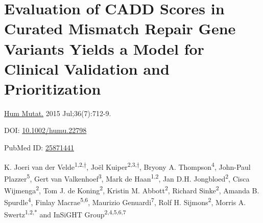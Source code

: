 \linespread{1.00} %
\chapter[Evaluation of CADD Scores in Mismatch Repair Genes]{Evaluation of CADD Scores in Curated Mismatch Repair Gene Variants Yields a Model for Clinical Validation and Prioritization}
\label{chap:caddmmr}
\linespread{1.05} %

{ \Large {} }

\hfill \underline{Hum Mutat.} 2015 Jul;36(7):712-9.

\hfill DOI: \href{https://doi.org/10.1002/humu.22798}{10.1002/humu.22798}

\hfill PubMed ID: \href{https://www.ncbi.nlm.nih.gov/pubmed/25871441}{25871441}


\newpage

\noindent
K. Joeri van der Velde\textsuperscript{1,2,†}, Joël Kuiper\textsuperscript{2,3,†}, Bryony A. Thompson\textsuperscript{4}, John-Paul Plazzer\textsuperscript{5}, Gert van Valkenhoef\textsuperscript{3}, Mark de Haan\textsuperscript{1,2}, Jan D.H. Jongbloed\textsuperscript{2}, Cisca Wijmenga\textsuperscript{2}, Tom J. de Koning\textsuperscript{2}, Kristin M. Abbott\textsuperscript{2}, Richard Sinke\textsuperscript{2}, Amanda B. Spurdle\textsuperscript{4}, Finlay Macrae\textsuperscript{5,6}, Maurizio Genuardi\textsuperscript{7}, Rolf H. Sijmons\textsuperscript{2}, Morris A. Swertz\textsuperscript{1,2,*} and InSiGHT Group\textsuperscript{2,4,5,6,7}\\

